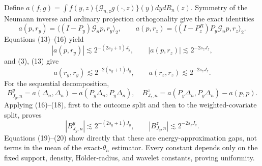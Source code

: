 Define \(a(f,g)=\int f(y,z)\{\mathcal G_{n,z}g(\cdot,z)\}(y)dydR_n(z)\). Symmetry of the Neumann inverse and ordinary projection orthogonality give the exact identities
\[
a(p,r_y)=\langle(I-P_y)\mathcal G_np,r_y\rangle_2,
\qquad
a(p,r_z)=\langle(I-P_z^R)P_y\mathcal G_np,r_z\rangle_2.          \tag{16}
\]
Equations (13)--(16) yield
\[
|a(p,r_y)|\lesssim2^{-(2s_y+1)J_y},
\qquad |a(p,r_z)|\lesssim2^{-2s_zJ_z},                           \tag{17}
\]
and (3), (13) give
\[
a(r_y,r_y)\lesssim2^{-2(s_y+1)J_y},
\qquad a(r_z,r_z)\lesssim2^{-2s_zJ_z}.                           \tag{18}
\]
For the sequential decomposition,
\[
B^y_{J_y,n}=a(\Delta_n,\Delta_n)-a(P_y\Delta_n,P_y\Delta_n),
\quad
B^z_{J_z,n}=a(P_y\Delta_n,P_y\Delta_n)-a(p,p).                   \tag{19}
\]
Applying (16)--(18), first to the outcome split and then to the weighted-covariate split, proves
\[
|B^y_{J_y,n}|\lesssim2^{-(2s_y+1)J_y},
\qquad |B^z_{J_z,n}|\lesssim2^{-2s_zJ_z}.                        \tag{20}
\]
Equations (19)--(20) show directly that these are energy-approximation gaps, not terms in the mean of the exact-\(\theta_n\) estimator. Every constant depends only on the fixed support, density, H\"older-radius, and wavelet constants, proving uniformity.